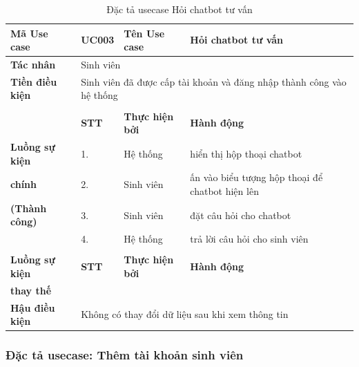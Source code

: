 \documentclass[12pt,a4paper]{report}
\begin{document}
\begin{table}[H]
\renewcommand{\arraystretch}{1.4} %
\centering
\begin{tabularx}{\textwidth}{|>{\columncolor[HTML]{C6E0B4}}l|l|l|X|}
\hline
\textbf{Mã Use case} & UC003 & \textbf{Tên Use case} & Hỏi chatbot tư vấn \\ \hline
\textbf{Tác nhân} & \multicolumn{3}{l|}{Sinh viên} \\ \hline
\textbf{Tiền điều kiện} & \multicolumn{3}{p{13cm}|}{Sinh viên đã được cấp tài khoản và đăng nhập thành công vào hệ thống} \\ \hline
 & \multicolumn{3}{l|}{} \\
 & \cellcolor[HTML]{F8CBAD}\textbf{STT} & \cellcolor[HTML]{F8CBAD}\textbf{Thực hiện bởi} & \cellcolor[HTML]{F8CBAD}\textbf{Hành động} \\ \cline{2-4} 
\textbf{Luồng sự kiện} & 1. & Hệ thống & hiển thị hộp thoại chatbot \\ \cline{2-4} 
\textbf{chính} & 2. & Sinh viên & ấn vào biểu tượng hộp thoại để chatbot hiện lên \\ \cline{2-4} 
\textbf{(Thành công)} & 3. & Sinh viên & đặt câu hỏi cho chatbot \\ \cline{2-4} 
\multirow{-6}{*}{\textbf{}} & 4. & Hệ thống & trả lời câu hỏi cho sinh viên \\ \hline
 & \multicolumn{3}{l|}{} \\
\textbf{Luồng sự kiện} & \cellcolor[HTML]{F8CBAD}\textbf{STT} & \cellcolor[HTML]{F8CBAD}\textbf{Thực hiện bởi} & \cellcolor[HTML]{F8CBAD}\textbf{Hành động} \\ \cline{2-4} 
\textbf{thay thế} & & & \\ \hline
\textbf{Hậu điều kiện} & \multicolumn{3}{l|}{Không có thay đổi dữ liệu sau khi xem thông tin} \\ \hline
\end{tabularx}
\caption{Đặc tả usecase Hỏi chatbot tư vấn}
\end{table}

\subsubsection{Đặc tả usecase: Thêm tài khoản sinh viên}

\end{document}
